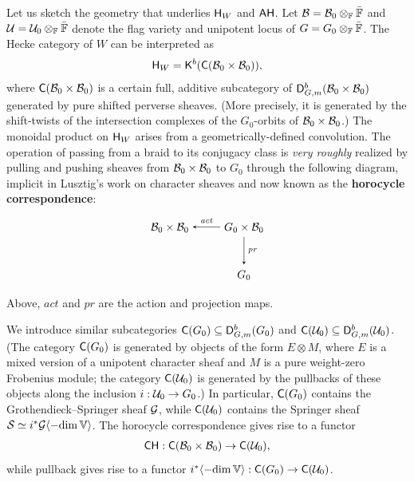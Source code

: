 \documentclass[a4paper,10pt,leqno]{amsart}
\theoremstyle{plain}
\theoremstyle{plain}
\theoremstyle{plain}
\theoremstyle{definition}
\theoremstyle{remark}
\newcommand{\dfemph}[1]{\textbf{#1}}
\newcommand{\act}{\mathit{act}}
\renewcommand{\pr}{\mathit{pr}}
\begin{document}
Let us sketch the geometry that underlies $\sf{H}_W$ and $\sf{AH}$.
Let $\cal{B} = \cal{B}_0 \otimes_\bb{F} \bar{\bb{F}}$ and $\cal{U} = \cal{U}_0 \otimes_\bb{F} \bar{\bb{F}}$ denote the flag variety and unipotent locus of $G = G_0 \otimes_\bb{F} \bar{\bb{F}}$.
The Hecke category of $W$ can be interpreted as
\begin{align}
\sf{H}_W = \sf{K}^b(\sf{C}(\cal{B}_0 \times \cal{B}_0)),
\end{align}
where $\sf{C}(\cal{B}_0 \times \cal{B}_0)$ is a certain full, additive subcategory of $\sf{D}_{G, m}^b(\cal{B}_0 \times \cal{B}_0)$ generated by pure shifted perverse sheaves.
(More precisely, it is generated by the shift-twists of the intersection complexes of the $G_0$-orbits of $\cal{B}_0 \times \cal{B}_0$.)
The monoidal product on $\sf{H}_W$ arises from a geometrically-defined convolution.
The operation of passing from a braid to its conjugacy class is \emph{very roughly} realized by pulling and pushing sheaves from $\cal{B}_0 \times \cal{B}_0$ to $G_0$ through the following diagram, implicit in Lusztig's work on character sheaves and now known as the \dfemph{horocycle correspondence}:
\begin{equation}
\begin{tikzpicture}[baseline=(current bounding box.center), >=stealth]
\matrix(m)[matrix of math nodes, row sep=2.5em, column sep=2.5em, text height=2ex, text depth=0.5ex]
{	\cal{B}_0 \times \cal{B}_0
		&G_0 \times \cal{B}_0\\
	{}
		&G_0\\
		};
\path[->,font=\scriptsize, auto]
(m-1-2)		edge node[above]{$\act$} (m-1-1)
(m-1-2)		edge node[right]{$\pr$} (m-2-2);
\end{tikzpicture}
\end{equation}
Above, $\act$ and $\pr$ are the action and projection maps.

We introduce similar subcategories $\sf{C}(G_0) \subseteq \sf{D}_{G, m}^b(G_0)$ and $\sf{C}(\cal{U}_0) \subseteq \sf{D}_{G, m}^b(\cal{U}_0)$.
(The category $\sf{C}(G_0)$ is generated by objects of the form $E \otimes M$, where $E$ is a mixed version of a unipotent character sheaf and $M$ is a pure weight-zero Frobenius module; the category $\sf{C}(\cal{U}_0)$ is generated by the pullbacks of these objects along the inclusion $i : \cal{U}_0 \to G_0$.)
In particular, $\sf{C}(G_0)$ contains the Grothendieck--Springer sheaf $\cal{G}$, while $\sf{C}(\cal{U}_0)$ contains the Springer sheaf $\cal{S} \simeq i^\ast \cal{G}\langle -{\dim \bb{V}}\rangle$.
The horocycle correspondence gives rise to a functor 
\begin{align}
\sf{CH} : \sf{C}(\cal{B}_0 \times \cal{B}_0) \to \sf{C}(\cal{U}_0),
\end{align}
while pullback gives rise to a functor $i^\ast \langle-{\dim \bb{V}}\rangle : \sf{C}(G_0) \to \sf{C}(\cal{U}_0)$.
\end{document}
